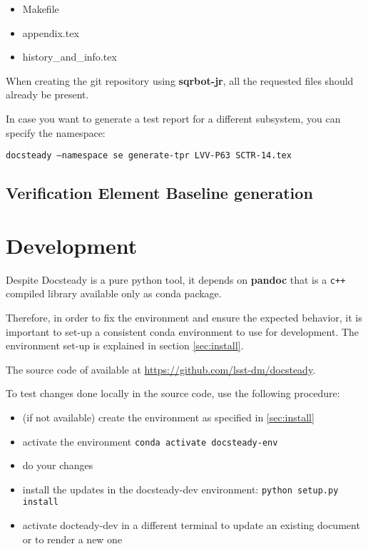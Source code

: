 \documentclass[DM]{lsstdoc}
\begin{document}
\begin{itemize}
\item Makefile
\item appendix.tex
\item history\_and\_info.tex
\end{itemize}

When creating the git repository using \textbf{sqrbot-jr}, all the requested files should already be present.

In case you want to generate a test report for a different subsystem, you can specify the  namespace:

\texttt{docsteady --namespace se generate-tpr LVV-P63 SCTR-14.tex}



\subsection{Verification Element Baseline generation}


\section{Development}
\label{sec:development}

Despite Docsteady is a pure python tool, it depends on \textbf{pandoc} that is a \texttt{c++} compiled library available only as conda package.

Therefore, in order to fix the environment and ensure the expected behavior, it is important to set-up a consistent conda environment to use for development.
The environment set-up is explained in section \ref{sec:install}.

The source code of available at \url{https://github.com/lsst-dm/docsteady}.

To test changes done locally in the source code, use the following procedure:

\begin{itemize}
\item (if not available) create the environment as specified in \ref{sec:install}
\item activate the environment \texttt{conda activate docsteady-env}
\item do your changes
\item install the updates in the docsteady-dev environment: \texttt{python setup.py install}
\item activate docteady-dev in a different terminal to update an existing document or to render a new one
\end{itemize}
\end{document}
